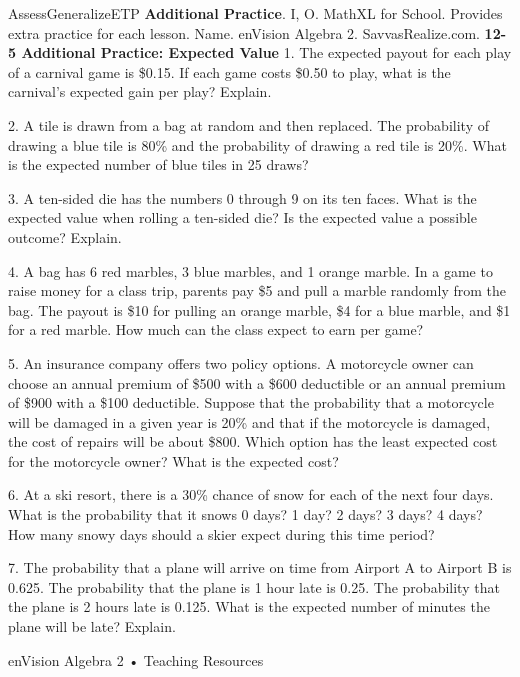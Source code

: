 \documentclass{article}
\newenvironment{te-addendum}[2]{}{}     %
\newcommand{\answer}[1]{}               %
\begin{document}
\begin{te-addendum}{Assess}{GeneralizeETP}
\textbf{Additional Practice}. I, O. MathXL for School.
Provides extra practice for each lesson.
Name. enVision Algebra 2. SavvasRealize.com.
\textbf{12-5 Additional Practice: Expected Value}
1. The expected payout for each play of a carnival game is \$0.15. If each game costs \$0.50 to play, what is the carnival's expected gain per play? Explain.
\answer{\$0.35; The carnival will make an average of (\$0.50-\$0.15=\$0.35) each time the game is played.}
2. A tile is drawn from a bag at random and then replaced. The probability of drawing a blue tile is 80\% and the probability of drawing a red tile is 20\%. What is the expected number of blue tiles in 25 draws?
\answer{20}
3. A ten-sided die has the numbers 0 through 9 on its ten faces. What is the expected value when rolling a ten-sided die? Is the expected value a possible outcome? Explain.
\answer{4.5; No; Sample answer: It is not a possible outcome since as a non-integer value, it is not actually one of the outcomes.}
4. A bag has 6 red marbles, 3 blue marbles, and 1 orange marble. In a game to raise money for a class trip, parents pay \$5 and pull a marble randomly from the bag. The payout is \$10 for pulling an orange marble, \$4 for a blue marble, and \$1 for a red marble. How much can the class expect to earn per game?
\answer{\$2.20}
5. An insurance company offers two policy options. A motorcycle owner can choose an annual premium of \$500 with a \$600 deductible or an annual premium of \$900 with a \$100 deductible. Suppose that the probability that a motorcycle will be damaged in a given year is 20\% and that if the motorcycle is damaged, the cost of repairs will be about \$800. Which option has the least expected cost for the motorcycle owner? What is the expected cost?
\answer{premium of \$500 with \$600 deductible; \$620}
6. At a ski resort, there is a 30\% chance of snow for each of the next four days. What is the probability that it snows 0 days? 1 day? 2 days? 3 days? 4 days? How many snowy days should a skier expect during this time period?
\answer{0.2401; 0.4116; 0.2646; 0.0756; 0.0081; 1.2 days}
7. The probability that a plane will arrive on time from Airport A to Airport B is 0.625. The probability that the plane is 1 hour late is 0.25. The probability that the plane is 2 hours late is 0.125. What is the expected number of minutes the plane will be late? Explain.
\answer{30 minutes; (E=0(0.625)+1(0.25)+2(0.125)=0.5) and 0.5 hour = 30 minutes}
enVision Algebra 2 • Teaching Resources
\end{te-addendum}
\end{document}
